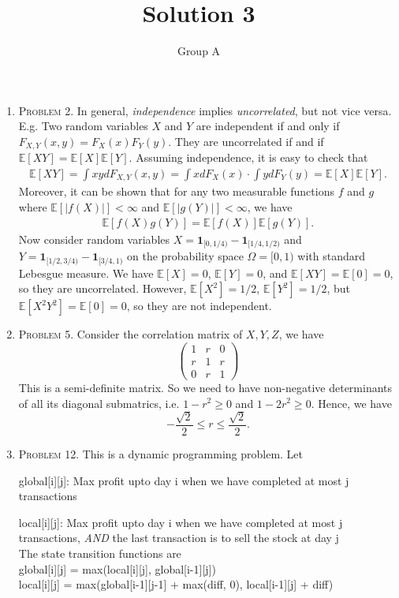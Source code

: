 \documentclass[10pt, onecolumn, draftcls]{IEEEtran}
\begin{document}
\title{Solution 3}
\author{Group A}
\maketitle


\begin{enumerate}
\item \textsc{Problem 2.} In general, \emph{independence} implies \emph{uncorrelated}, but not vice versa.\\
E.g. Two random variables $X$ and $Y$ are independent if and only if $F_{X, Y}(x, y) = F_X(x)F_Y(y)$. They are uncorrelated if and if $\mathbb{E}[XY] = \mathbb{E}[X]\mathbb{E}[Y]$. Assuming independence, it is easy to check that
\begin{align*}
\mathbb{E}[XY] = \int xy dF_{X, Y}(x, y) = \int xdF_X(x)\cdot\int ydF_Y(y) = \mathbb{E}[X]\mathbb{E}[Y].
\end{align*}
Moreover, it can be shown that for any two measurable functions $f$ and $g$ where $\mathbb{E}[|f(X)|] < \infty$ and $\mathbb{E}[|g(Y)|] < \infty$, we have
\begin{align*}
\mathbb{E}[f(X)g(Y)] = \mathbb{E}[f(X)]\mathbb{E}[g(Y)].
\end{align*}
Now consider random variables $X = \textbf{1}_{[0, 1/4)} - \textbf{1}_{[1/4, 1/2)}$ and $Y = \textbf{1}_{[1/2, 3/4)} - \textbf{1}_{[3/4, 1)}$ on the probability space $\Omega = [0, 1)$ with standard Lebesgue measure. We have $\mathbb{E}[X] = 0$, $\mathbb{E}[Y] = 0$, and $\mathbb{E}[XY] = \mathbb{E}[0] = 0$, so they are uncorrelated. However, $\mathbb{E}[X^2] = 1/2$, $\mathbb{E}[Y^2] = 1/2$, but $\mathbb{E}[X^2Y^2] = \mathbb{E}[0] = 0$, so they are not independent.

\item \textsc{Problem 5.} Consider the correlation matrix of $X, Y, Z$, we have
\[ \left(
\begin{array}{ccc}
1 &r &0\\
r &1 &r\\
0 &r &1
\end{array}
\right) \]
This is a semi-definite matrix. So we need to have non-negative determinants of all its diagonal submatrics, i.e. $1 -r^2 \geq 0$ and $1-2r^2\geq 0$. Hence, we have 
$$-\frac{\sqrt{2}}{2}\leq r\leq \frac{\sqrt{2}}{2}.$$


\item \textsc{Problem 12.} This is a dynamic programming problem. Let 
\par global[i][j]: Max profit upto day i when we have completed at most j transactions
\par local[i][j]: Max profit upto day i when we have completed at most j transactions, \emph{AND} the last transaction is to sell the stock at day j\\
The state transition functions are\\
global[i][j] = max(local[i][j], global[i-1][j]) \\ 
local[i][j] = max(global[i-1][j-1] + max(diff, 0), local[i-1][j] + diff) 


\end{enumerate}
\end{document}
